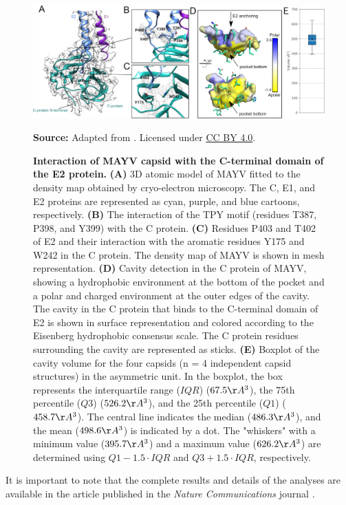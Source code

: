 \documentclass[Ingles]{phdthesis}
\begin{document}
\begin{figure}[hp]
  \centerline{\includegraphics[scale=1]{images/mayv-c-e2.png}}
  \centerline{\tiny{\textbf{Source:} Adapted from \cite{ribeiro2021}. Licensed under \href{https://creativecommons.org/licenses/by/4.0/}{CC BY 4.0}.}}
  \caption[Interaction of MAYV capsid with the C-terminal domain of the E2 protein]{\textbf{Interaction of MAYV capsid with the C-terminal domain of the E2 protein.} \textbf{(A)} 3D atomic model of \acs{MAYV} fitted to the density map obtained by cryo-electron microscopy. The C, E1, and E2 proteins are represented as cyan, purple, and blue cartoons, respectively. \textbf{(B)} The interaction of the TPY motif (residues T387, P398, and Y399) with the C protein. \textbf{(C)} Residues P403 and T402 of E2 and their interaction with the aromatic residues Y175 and W242 in the C protein. The density map of \acs{MAYV} is shown in mesh representation. \textbf{(D)} Cavity detection in the C protein of \acs{MAYV}, showing a hydrophobic environment at the bottom of the pocket and a polar and charged environment at the outer edges of the cavity. The cavity in the C protein that binds to the C-terminal domain of E2 is shown in surface representation and colored according to the Eisenberg hydrophobic consensus scale. The C protein residues surrounding the cavity are represented as sticks. \textbf{(E)} Boxplot of the cavity volume for the four capsids (n = 4 independent capsid structures) in the asymmetric unit. In the boxplot, the box represents the interquartile range ($IQR$) ($67.5 \AA^3$), the 75th percentile ($Q3$) ($526.2 \AA^3$), and the 25th percentile ($Q1$) ($458.7 \AA^3$). The central line indicates the median ($486.3 \AA^3$), and the mean ($498.6 \AA^3$) is indicated by a dot. The "whiskers" with a minimum value ($395.7 \AA^3$) and a maximum value ($626.2 \AA^3$) are determined using $Q1-1.5 \cdot IQR$ and $Q3+1.5 \cdot IQR$, respectively.}
  \label{fig:mayv-c-e2}
\end{figure}

It is important to note that the complete results and details of the analyses are available in the article published in the \textit{Nature Communications} journal \cite{ribeiro2021}.
\end{document}
